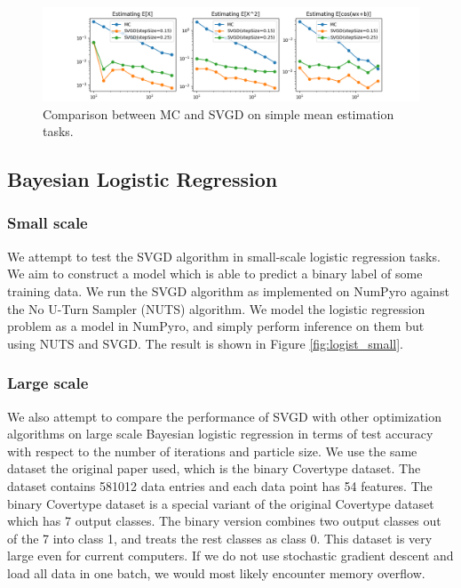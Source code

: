 \begin{figure}[h]
    \centering
    \includegraphics[width=\textwidth]{figs/toy-figure2-merged.png}
    \caption{Comparison between MC and SVGD on simple mean estimation tasks. }
    \label{fig:my_label}
\end{figure}

\subsection{Bayesian Logistic Regression}
\subsubsection{Small scale}
We attempt to test the SVGD algorithm in small-scale logistic regression tasks. We aim to construct a model which is able to predict a binary label of some training data. We run the SVGD algorithm as implemented on NumPyro against the No U-Turn Sampler (NUTS) algorithm. We model the logistic regression problem as a model in NumPyro, and simply perform inference on them but using NUTS and SVGD. The result is shown in Figure \ref{fig:logist_small}.

\subsubsection{Large scale}
We also attempt to compare the performance of SVGD with other optimization algorithms on large scale Bayesian logistic regression in terms of test accuracy with respect to the number of iterations and particle size. We use the same dataset the original paper used, which is the binary Covertype dataset. The dataset contains 581012 data entries and each data point has 54 features. The binary Covertype dataset is a special variant of the original Covertype dataset which has 7 output classes. The binary version combines two output classes out of the 7 into class 1, and treats the rest classes as class 0. This dataset is very large even for current computers. If we do not use stochastic gradient descent and load all data in one batch, we would most likely encounter memory overflow. 

